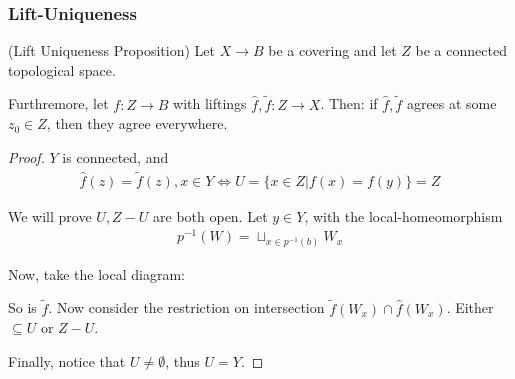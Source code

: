 \documentclass[Total.tex]{subfiles}
\begin{document}
			\subsubsection{Lift-Uniqueness}
			\begin{proposition}
				(Lift Uniqueness Proposition) Let $X\rightarrow B$ be a covering and let $Z$ be a connected topological space.
				
				Furthremore, let $f:Z\rightarrow B$ with liftings $\hat{f},\tilde{f}:Z\rightarrow X$. Then: if $\hat{f},\tilde{f}$ agrees at some $z_0\in Z$, then they agree everywhere.
			\end{proposition}
			\begin{proof}
				$Y$ is connected, and 
				\begin{gather*}
					\hat{f}(z)=\tilde{f}(z),x\in Y\Leftrightarrow U=\{x\in Z|f(x)=f(y)\}=Z
				\end{gather*}
				
				We will prove $U,Z-U$ are both open. Let $y\in Y$, with the local-homeomorphism
				\begin{gather*}
					p^{-1}(W)=\sqcup_{x\in p^{-1}(b)} W_x
				\end{gather*}
				
				Now, take the local diagram:
				\begin{center}
				\end{center}
				
				So is $\tilde{f}$. Now consider the restriction on intersection $\tilde{f}(W_x)\cap \hat{f}(W_x)$. Either $\subseteq U$ or $Z-U$. 
				
				Finally, notice that $U\not=\emptyset$, thus $U=Y$.
			\end{proof}
\end{document}
